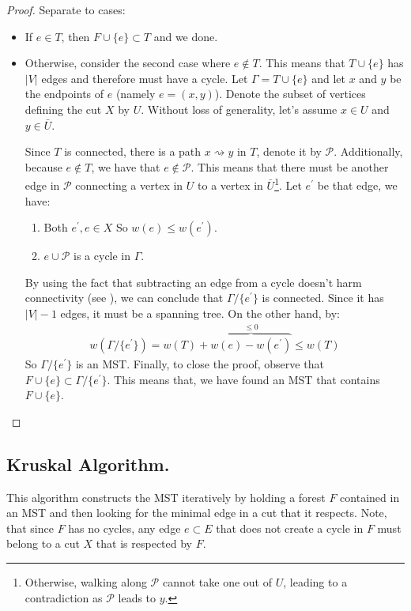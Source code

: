 \begin{proof} Separate to cases: 
  \begin{itemize}
    \item If $e \in T$, then $F \cup \{ e \} \subset T$ and we done.
    \item Otherwise, consider the second case where $e \notin T$. This means that $T \cup \{ e \}$ has $|V|$ edges and therefore must have a cycle. Let $\Gamma = T \cup \{ e \}$ and let $x$ and $y$ be the endpoints of $e$ (namely $e = (x,y)$). Denote the subset of vertices defining the cut $X$ by $U$. Without loss of generality, let's assume $x \in U$ and $y \in \bar{U}$.


Since $T$ is connected, there is a path $x \rightsquigarrow y$ in $T$, denote it by $\mathcal{P}$. Additionally, because $e \notin T$, we have that $e \notin \mathcal{P}$. This means that there must be another edge in $\mathcal{P}$ connecting a vertex in $U$ to a vertex in $\bar{U}$\footnote{Otherwise, walking along $\mathcal{P}$ cannot take one out of $U$, leading to a contradiction as $\mathcal{P}$ leads to $y$.}. Let $e^{\prime}$ be that edge, we have:\begin{enumerate}
    \item Both $e^{\prime}, e \in X$ So $w(e) \le w(e^{\prime})$.
    \item $e \cup \mathcal{P}$ is a cycle in $\Gamma$. 
  \end{enumerate}

By using the fact that subtracting an edge from a cycle doesn't harm connectivity (see ), we can conclude that $\Gamma/\{e^{\prime}\}$ is connected. Since it has $|V|-1$ edges, it must be a spanning tree. On the other hand, by:
  \begin{equation*}
    \begin{split}
      w\left( \Gamma/\{e^{\prime}\} \right) = w\left( T \right) + \overbrace{w(e) - w(e^{\prime})}^{ \le 0} \le w\left( T \right) 
    \end{split}
  \end{equation*}
  So $\Gamma/\{e^{\prime}\}$ is an MST.  Finally, to close the proof, observe that $F \cup \{e\} \subset \Gamma/\{e^{\prime}\}$. This means that, we have found an MST that contains $F \cup \{e\}$. 
  \end{itemize}

\end{proof}
\subsection{Kruskal Algorithm.} This algorithm constructs the MST iteratively by holding a forest $F$ contained in an MST and then looking for the minimal edge in a cut that it respects. Note, that since $F$ has no cycles, any edge $e \subset E$ that does not create a cycle in $F$ must belong to a cut $X$ that is respected by $F$.

